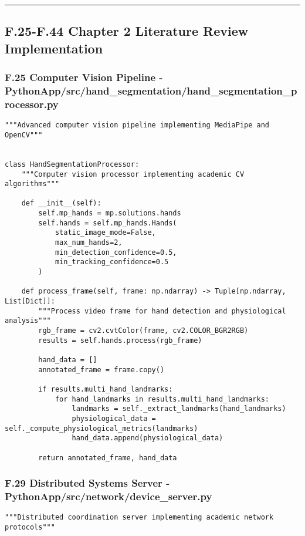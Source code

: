 \documentclass[12pt,a4paper]{report}
\begin{document}
{{\hrule

\subsection{F.25-F.44 Chapter 2 Literature Review Implementation}

\subsubsection{F.25 Computer Vision Pipeline - PythonApp/src/hand_segmentation/hand_segmentation_processor.py}

\begin{verbatim}
"""Advanced computer vision pipeline implementing MediaPipe and OpenCV"""


class HandSegmentationProcessor:
    """Computer vision processor implementing academic CV algorithms"""

    def __init__(self):
        self.mp_hands = mp.solutions.hands
        self.hands = self.mp_hands.Hands(
            static_image_mode=False,
            max_num_hands=2,
            min_detection_confidence=0.5,
            min_tracking_confidence=0.5
        )

    def process_frame(self, frame: np.ndarray) -> Tuple[np.ndarray, List[Dict]]:
        """Process video frame for hand detection and physiological analysis"""
        rgb_frame = cv2.cvtColor(frame, cv2.COLOR_BGR2RGB)
        results = self.hands.process(rgb_frame)

        hand_data = []
        annotated_frame = frame.copy()

        if results.multi_hand_landmarks:
            for hand_landmarks in results.multi_hand_landmarks:
                landmarks = self._extract_landmarks(hand_landmarks)
                physiological_data = self._compute_physiological_metrics(landmarks)
                hand_data.append(physiological_data)

        return annotated_frame, hand_data
\end{verbatim}

\subsubsection{F.29 Distributed Systems Server - PythonApp/src/network/device_server.py}

\begin{verbatim}
"""Distributed coordination server implementing academic network protocols"""



\end{verbatim}}}
\end{document}
